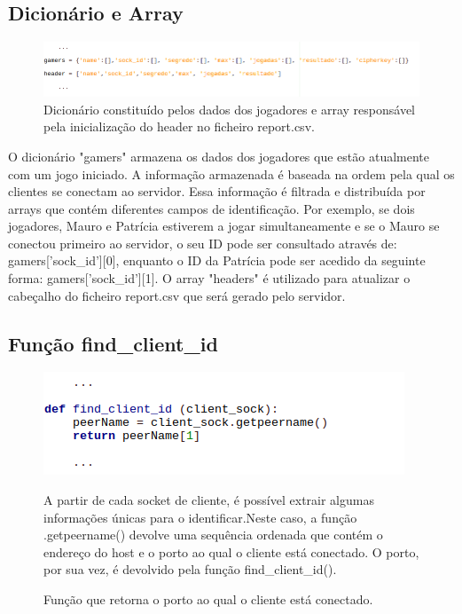 \documentclass{report}
\begin{document}
\subsection{Dicionário e Array}
\begin{figure}[H]
	\centering
	\includegraphics[scale=0.65]{dicionarioearray_server}	
	\caption{Dicionário constituído pelos dados dos jogadores e array responsável pela inicialização do header no ficheiro report.csv.}
\end{figure}

O dicionário "gamers" armazena os dados dos jogadores que estão atualmente com um jogo iniciado. A informação armazenada é baseada na ordem pela qual os clientes se conectam ao servidor. Essa informação é filtrada e distribuída por arrays que contém diferentes campos de identificação. Por exemplo, se dois jogadores, Mauro e Patrícia estiverem a jogar simultaneamente e se o Mauro se conectou primeiro ao servidor, o seu ID pode ser consultado através de: gamers['sock\_id'][0], enquanto o ID da Patrícia pode ser acedido da seguinte forma: gamers['sock\_id'][1].
O array "headers" é utilizado para atualizar o cabeçalho do ficheiro report.csv que será gerado pelo servidor.

\subsection{Função \textbf{find\_client\_id}}
\begin{figure}[H]
	\centering
	\includegraphics[scale=0.65]{find_client_id}	
	\caption{Função que retorna o porto ao qual o cliente está conectado.}

	A partir de cada socket de cliente, é possível extrair algumas informações únicas para o identificar.Neste caso, a função .getpeername() devolve uma sequência ordenada que contém o endereço do host e o porto ao qual o cliente está conectado. O porto, por sua vez, é devolvido pela função find\_client\_id().

\end{figure}
\end{document}
